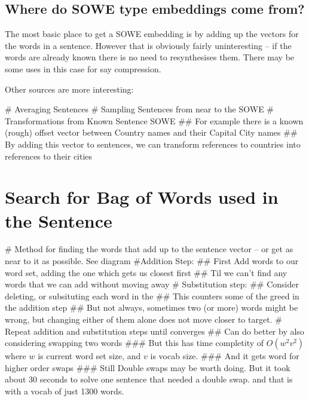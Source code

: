 \documentclass[]{scrartcl}
\numberwithin{equation}{section}
\numberwithin{figure}{section}
\theoremstyle{plain}
\theoremstyle{definition}
\begin{document}

\subsection{Where do SOWE type embeddings come from?}
The most basic place to get a SOWE embedding is by adding up the vectors for the words in a sentence.
However that is obviously fairly uninteresting -- if the words are already known there is no need to resynthesises them. There may be some uses in this case for say compression.

Other sources are more interesting:

\begin{easylist}[itemize]
	# Averaging Sentences
	# Sampling Sentences from near to the SOWE
	# Transformations from Known Sentence SOWE
	## For example there is a known (rough) offset vector between Country names and their Capital City names
	## By adding this vector to sentences, we can transform references to countries into references to their cities
\end{easylist}


\section{Search for Bag of Words used in the Sentence}



\begin{easylist}[itemize]
	# Method for finding the words that add up to the sentence vector -- or get as near to it as possible. See diagram
	#Addition Step:
	## First Add words to our word set, adding the one which gets us closest first
	## Til we can't find any words that we can add without moving away
	# Substitution step:
	## Consider deleting, or subsituting each word in the
	## This counters some of the greed in the addition step
	## But not always, sometimes two (or more) words might be wrong, but changing either of them alone does not move closer to target.
	# Repeat addition and substitution steps until converges
	## Can do better by also considering swapping two words
	### But this has time completity of $O(w^2 v^2)$ where $w$ is current word set size, and $v$ is vocab size.
	### And it gets word for higher order swaps
	### Still Double swaps may be worth doing. But it took about 30 seconds to solve one sentence that needed a double swap. and that is with a vocab of just 1300 words.
\end{easylist}
\end{document}
